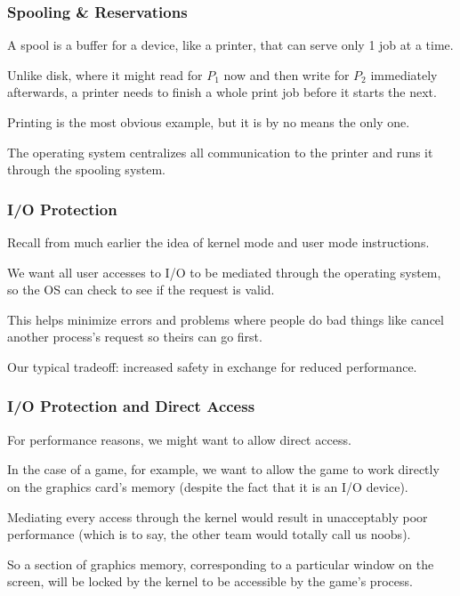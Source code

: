 \begin{frame}
\frametitle{Spooling \& Reservations}

A \alert{spool} is a buffer for a device, like a printer, that can serve only 1 job at a time. 

Unlike disk, where it might read for $P_{1}$ now and then write for $P_{2}$ immediately afterwards, a printer needs to finish a whole print job before it starts the next. 

Printing is the most obvious example, but it is by no means the only one. 

The operating system centralizes all communication to the printer and runs it through the spooling system. 


\end{frame}



\begin{frame}
\frametitle{I/O Protection}

Recall from much earlier the idea of kernel mode and user mode instructions. 

We want all user accesses to I/O to be mediated through the operating system, so the OS can check to see if the request is valid. 

This helps minimize errors and problems where people do bad things like cancel another process's request so theirs can go first. 

Our typical tradeoff: increased safety in exchange for reduced performance.



\end{frame}

\begin{frame}
\frametitle{I/O Protection and Direct Access}

For performance reasons, we might want to allow direct access. 

In the case of a game, for example, we want to allow the game to work directly on the graphics card's memory (despite the fact that it is an I/O device). 

Mediating every access through the kernel would result in unacceptably poor performance (which is to say, the other team would totally call us noobs). 

So a section of graphics memory, corresponding to a particular window on the screen, will be locked by the kernel to be accessible by the game's process.


\end{frame}

